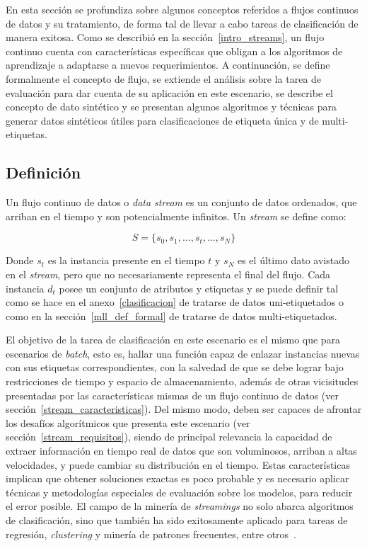 En esta sección se profundiza sobre algunos conceptos referidos a flujos
continuos de datos y su tratamiento, de forma tal de llevar a cabo tareas de
clasificación de manera exitosa.  Como se describió en la
sección~\ref{intro_streams}, un flujo continuo cuenta con características
específicas que obligan a los algoritmos de aprendizaje a adaptarse a nuevos
requerimientos.  A continuación, se define formalmente el concepto de flujo, se
extiende el análisis sobre la tarea de evaluación para dar cuenta de su
aplicación en este escenario, se describe el concepto de dato sintético y se
presentan algunos algoritmos y técnicas para generar datos sintéticos útiles
para clasificaciones de etiqueta única y de multi-etiquetas.

\subsection{Definición}

Un flujo continuo de datos o \textit{data stream} es un conjunto de datos
ordenados, que arriban en el tiempo y son potencialmente infinitos. Un
\textit{stream} se define como:

\begin{equation}
	S = \{s_{0}, s_{1}, \dots, s_{t}, \dots, s_{N}\}
\end{equation}

Donde $s_{t}$ es la instancia presente en el tiempo $t$ y $s_{N}$ es el último
dato avistado en el \textit{stream}, pero que no necesariamente representa el
final del flujo. Cada instancia $d_{t}$ posee un conjunto de atributos y
etiquetas y se puede definir tal como se hace en el anexo~\ref{clasificacion} de
tratarse de datos uni-etiquetados o como en la sección~\ref{mll_def_formal} de
tratarse de datos multi-etiquetados.

El objetivo de la tarea de clasificación en este escenario es el mismo que para
escenarios de \textit{batch}, esto es, hallar una función capaz de enlazar
instancias nuevas con sus etiquetas correspondientes, con la salvedad de que se
debe lograr bajo restricciones de tiempo y espacio de almacenamiento, además de
otras vicisitudes presentadas por las características mismas de un flujo
continuo de datos (ver sección~\ref{stream_caracteristicas}). Del mismo modo,
deben ser capaces de afrontar los desafíos algorítmicos que presenta este
escenario (ver sección~\ref{stream_requisitos}), siendo de principal relevancia
la capacidad de extraer información en tiempo real de datos que son voluminosos,
arriban a altas velocidades, y puede cambiar su distribución en el tiempo. Estas
características implican que obtener soluciones exactas es poco probable y es
necesario aplicar técnicas y metodologías especiales de evaluación sobre los
modelos, para reducir el error posible. El campo de la minería de
\textit{streamings} no solo abarca algoritmos de clasificación, sino que también
ha sido exitosamente aplicado para tareas de regresión, \textit{clustering} y
minería de patrones frecuentes, entre otros~\cite{bifet_machine_2018}.

